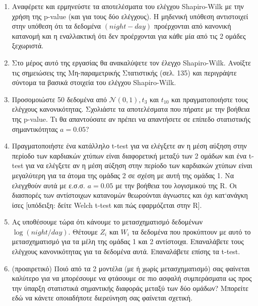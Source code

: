 \documentclass[oneside,a4paper]{article}
\newcommand {\tl}{\textlatin}
\begin{document}
\begin{enumerate}
    \item Αναφέρετε και ερμηνεύστε τα αποτελέσματα του ελέγχου \tl{Shapiro-Wilk} με την χρήση της \tl{p-value} (και για τους δύο ελέγχους). Η μηδενική υπόθεση αντιστοιχεί στην υπόθεση ότι τα δεδομένα $(night - day)$ προέρχονται από κανονική κατανομή και η εναλλακτική ότι δεν προέρχονται για κάθε μία από τις 2 ομάδες ξεχωριστά.
    \item Στο μέρος αυτό της εργασίας θα ανακαλύψετε τον έλεγχο \tl{Shapiro-Wilk}. Ανοίξτε τις σημειώσεις της Μη-παραμετρικής Στατιστικής (σελ. 135) και περιγράψτε σύντομα τα βασικά στοιχεία του ελέγχου \tl{Shapiro-Wilk}.
    \item Προσομοιώστε 50 δεδομένα από $\mathcal{N} (0,1), t_3$ και $t_{10}$ και πραγματοποιήστε τους ελέγχους κανονικότητας. Σχολιάστε τα αποτελέσματα που πήρατε με την βοήθεια της \tl{p-value}. Τι θα απαντούσατε αν πρέπει να απαντήσετε σε επίπεδο στατιστικής σημαντικότητας $a = 0.05$?
    \item Πραγματοποιήστε ένα κατάλληλο \tl{t-test} για να ελέγξετε αν η μέση αύξηση στην περίοδο των καρδιακών χτύπων είναι διαφορετική μεταξύ των 2 ομάδων και ένα \tl{t-test} για να ελέγξετε αν η μέση αύξηση στην περίοδο των καρδιακών χτύπων είναι μεγαλύτερη για τα άτομα της ομάδας 2 σε σχέση με αυτή της ομάδας 1. Να ελεγχθούν αυτά με ε.σ.σ. $a=0.05$ με την βοήθεια του λογισμικού της \tl{R}. Οι διασπορές των αντίστοιχων κατανομών θεωρούνται άγνωστες και όχι κατ`ανάγκη ίσες [υπόδειξη: δείτε \tl{Welch t-test} και πώς εφαρμόζεται στην \tl{R}].
    \item Ας υποθέσουμε τώρα ότι κάνουμε το μετασχηματισμό δεδομένων $\log (night/day)$. Θέτουμε $Z_i$ και $W_i$ τα δεδομένα που προκύπτουν με αυτό το μετασχηματισμό για τα μέλη της ομάδας 1 και 2 αντίστοιχα. Επαναλάβετε τους ελέγχους κανονικότητας για τα δεδομένα αυτά. Επαναλάβετε επίσης τα \tl{t-test}.
    \item (προαιρετικό) Ποιό από τα 2 μοντέλα (με ή χωρίς μετασχηματισμό) σας φαίνεται καλύτερο για να μπορέσουμε να φτάσουμε σε πιο ασφαλή συμπεράσματα ως προς την ύπαρξη στατιστικά σημαντικής διαφοράς μεταξύ των δύο ομάδων? Μπορείτε εδώ να κάνετε οποιαδήποτε διερεύνηση σας φαίνεται σχετική.
\end{enumerate}
\end{document}
